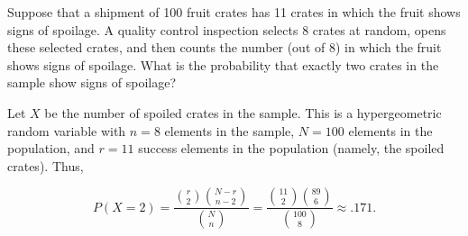 \question Suppose that a shipment of 100 fruit crates has 11 crates in which the
fruit shows signs of spoilage.  A quality control inspection selects 8 crates
at random, opens these selected crates, and then counts the number (out of 8)
in which the fruit shows signs of spoilage.  What is the probability that
exactly two crates in the sample show signs of spoilage?



\begin{solution}
Let $X$ be the number of spoiled crates in the sample.  This is a
hypergeometric random variable with $n = 8$ elements in the sample, $N = 100$
elements in the population, and $r = 11$ success elements in the population
(namely, the spoiled crates).  Thus,

\[
  P(X = 2)
    = \frac{\binom{r}{2} \binom{N - r}{n - 2}}{\binom{N}{n}}
    = \frac{\binom{11}{2} \binom{89}{6}}{\binom{100}{8}}
    \approx .171.
\]
\end{solution}


